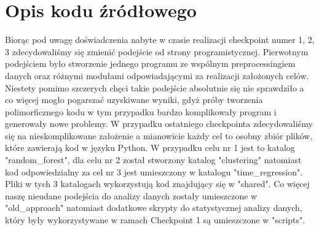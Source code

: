 \documentclass{classrep}
\begin{document}
    \section{Opis kodu źródłowego} {
        Biorąc pod uwagę doświadczenia nabyte w czasie realizacji checkpoint numer 1, 2, 3
        zdecydowaliśmy się zmienić podejście od strony programistycznej. Pierwotnym
        podejściem było stworzenie jednego programu ze wspólnym preprocessingiem danych
        oraz różnymi modułami odpowiadającymi za realizacji założonych celów. Niestety
        pomimo szczerych chęci takie podejście absolutnie się nie sprawdziło a co więcej
        mogło pogarszać uzyskiwane wyniki, gdyż próby tworzenia polimorficznego kodu
        w tym przypadku bardzo komplikowały program i generowały nowe problemy.
        W przypadku ostatniego checkpointa zdecydowaliśmy się na nieskomplikowane
        założenie a mianowicie każdy cel to osobny zbiór plików, które zawierają kod w
        języku Python.
        W przypadku celu nr 1 jest to katalog "random\_forest", dla celu nr 2 został stworzony katalog "clustering" natomiast kod odpowiedzialny za cel nr 3 jest umieszczony w katalogu "time\_regression". Pliki w tych 3 katalogach wykorzystują kod znajdujący się w "shared". Co więcej naszę nieudane podejścia do analizy danych zostały umieszczone w "old\_approach" natomiast dodatkowe skrypty do statystycznej analizy danych, który były wykorzystywane w ramach Checkpoint 1 są umieszczone w "scripts".
    }
    

    \begin{thebibliography}{0}
    \end{thebibliography}
\end{document}
